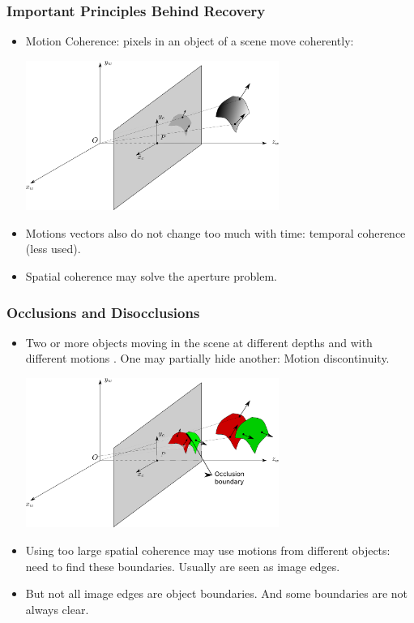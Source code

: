 \documentclass[10pt]{beamer}
\begin{document}
\begin{frame}
  \frametitle{Important Principles Behind Recovery}
  \begin{itemize}
  \item Motion Coherence: pixels in an object of a scene move coherently:
    \begin{center}
      \includegraphics[width=0.65\textwidth]{FIGURES/pinholecameramotioncoherence}
    \end{center}
  \item Motions vectors also do not change too much with time:
    temporal coherence (less used).  
  \item Spatial coherence may solve the aperture problem.
  \end{itemize}
\end{frame}


\begin{frame}
  \frametitle{Occlusions and Disocclusions}
  \begin{itemize}
  \item Two or more objects moving in the scene at different depths
    and with  different motions . One may partially hide another:
    Motion discontinuity.
    \begin{center}
        \includegraphics[width=0.65\textwidth]{FIGURES/pinholecameramotionocclusion}
    \end{center}
  \item Using too large spatial coherence may use motions from
    different objects: need to find these boundaries. Usually
    are seen as image edges.
  \item But not all image edges are object boundaries. And some
    boundaries are not always clear.
  \end{itemize}
\end{frame}
\end{document}
